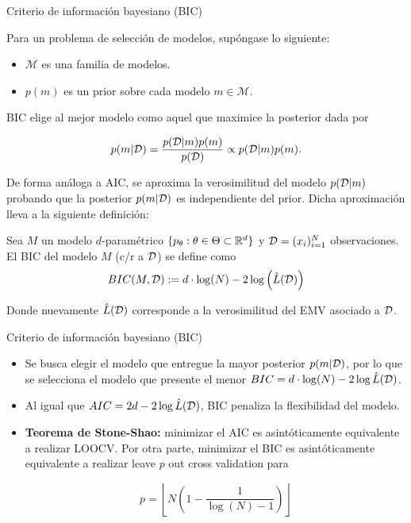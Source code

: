 \documentclass[handout, 9pt]{beamer}
\begin{document}
\begin{frame}{Criterio de información bayesiano (BIC)}

Para un problema de selección de modelos, supóngase lo siguiente:

\begin{itemize}
	\item $\mathcal{M}$ es una familia de modelos.
	\item $p(m)$ es un prior sobre cada modelo $m\in\mathcal{M}$.
\end{itemize}

BIC elige al mejor modelo como aquel que maximice la posterior dada por


\begin{equation*}
	p(m|{\mathcal D})=\frac{p({\mathcal D}|m)p(m)}{p({\mathcal D})}\propto p({\mathcal D}|m)p(m).
\end{equation*}

De forma análoga a AIC, se aproxima la verosimilitud del modelo $p({\mathcal D}|m)$ probando que la posterior $p(m|{\mathcal D})$ es independiente del prior. Dicha aproximación lleva a la siguiente definición:

\begin{definition}[BIC]
	Sea $M$ un modelo $d$-paramétrico $\{p_\theta:\theta\in\Theta\subset\mathbb{R}^d\}$ y ${\mathcal D}=(x_i)_{i=1}^N$ observaciones. El BIC del modelo $M$ (c/r a ${\mathcal D}$) se define como	
	\begin{equation*}
		BIC(M,{\mathcal D}):= d\cdot\log(N) - 2\log\left(\hat{L}({\mathcal D})\right)
	\end{equation*}
	
	Donde nuevamente $\hat{L}({\mathcal D})$ corresponde a la verosimilitud del EMV asociado a ${\mathcal D}$.
\end{definition}

\end{frame}

\begin{frame}{Criterio de información bayesiano (BIC)}

\begin{itemize}
	\item Se busca elegir el modelo que entregue la mayor posterior $p(m|{\mathcal D})$, por lo que se selecciona el modelo que presente el menor $BIC= d\cdot\log(N) - 2\log\hat{L}({\mathcal D})$.
	\item Al igual que $AIC=2d-2\log\hat{L}({\mathcal D})$, BIC penaliza la flexibilidad del modelo.
	\item \textbf{Teorema de Stone-Shao:} minimizar el AIC es asintóticamente equivalente a realizar LOOCV. Por otra parte, minimizar el BIC es asintóticamente equivalente a realizar leave $p$ out cross validation para

\begin{equation*}
	p=\left\lfloor N\left(1-\frac{1}{\log(N)-1}\right)\right\rfloor
\end{equation*}
\end{itemize}
	
\end{frame}
\end{document}
